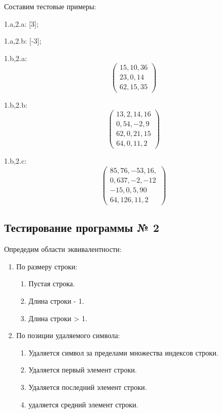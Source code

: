 \documentclass[a4paper,14pt]{extarticle}
\begin{document}
    Составим тестовые примеры:

    1.a,2.a: [3];

    1.a,2.b: [-3];

    1.b,2.a: $$\begin{pmatrix} 15, 10, 36 \\ 23, 0, 14 \\ 62, 15, 35 \end{pmatrix}$$

    1.b,2.b: $$\begin{pmatrix} 13, 2 , 14, 16 \\ 0, 54, -2, 9 \\ 62, 0, 21, 15 \\ 64, 0, 11, 2 \end{pmatrix}$$
    
    1.b,2.c: $$\begin{pmatrix} 85, 76 , -53, 16,  \\ 0, 637, -2, -12 \\ -15, 0, 5, 90 \\ 64, 126, 11, 2 \end{pmatrix}$$

    \subsection{Тестирование программы № 2}

    Опредедим области эквивалентности:
    \begin{enumerate}
        \item По размеру строки:
        \begin{enumerate}
            \item Пустая строка.
            \item Длина строки - 1.
            \item Длина строки > 1.
        \end{enumerate}
        \item По позиции удаляемого символа:
        \begin{enumerate}
            \item Удаляется символ за пределами множества индексов строки.
            \item Удаляется первый элемент строки.
            \item Удаляется последний элемент строки.
            \item удаляется средний элемент строки.
        \end{enumerate}
    \end{enumerate}
\end{document}
